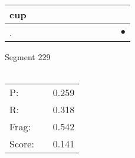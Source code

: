 \documentclass[landscape]{article}
\newcommand{\ssp}{\hspace{2pt}}
\newcommand{\mex}{\cellcolor{g}$\bullet$}
\begin{document}
\begin{tabular}{|l|p{10pt}|p{10pt}|p{10pt}|p{10pt}|p{10pt}|p{10pt}|p{10pt}|p{10pt}|p{10pt}|p{10pt}|}
\hline
\ssp cup \ssp&\hspace{2pt}&\hspace{2pt}&\hspace{2pt}&\hspace{2pt}&\hspace{2pt}&\hspace{2pt}&\hspace{2pt}&\hspace{2pt}&\hspace{2pt}&\hspace{2pt}\\
\hline
\ssp \cellcolor{ref9}. \ssp&\hspace{2pt}&\hspace{2pt}&\hspace{2pt}&\hspace{2pt}&\hspace{2pt}&\hspace{2pt}&\hspace{2pt}&\hspace{2pt}&\hspace{2pt}&\hspace{2pt}\mex\\
\hline
\end{tabular}

\vspace{6pt}
\noindent Segment 229\\\\
\noindent\begin{tabular}{lm{12pt}r}
\hline
P:&&0.259\\
R:&&0.318\\
Frag:&&0.542\\
Score:&&0.141\\
\end{tabular}

\newpage
\end{document}
